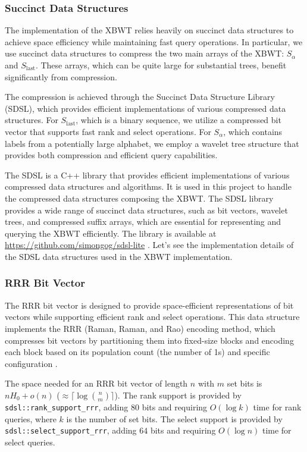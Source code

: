 \subsubsection{Succinct Data Structures}
The implementation of the XBWT relies heavily on succinct data structures to achieve space efficiency while maintaining fast query operations. In particular, we use succinct data structures to compress the two main arrays of the XBWT: $S_\alpha$ and $S_{\text{last}}$. These arrays, which can be quite large for substantial trees, benefit significantly from compression.

The compression is achieved through the Succinct Data Structure Library (SDSL), which provides efficient implementations of various compressed data structures. For $S_{\text{last}}$, which is a binary sequence, we utilize a compressed bit vector that supports fast rank and select operations. For $S_\alpha$, which contains labels from a potentially large alphabet, we employ a wavelet tree structure that provides both compression and efficient query capabilities.

The SDSL is a C++ library that provides efficient implementations of various compressed data structures and algorithms. It is used in this project to handle the compressed data structures composing the XBWT. The SDSL library provides a wide range of succinct data structures, such as bit vectors, wavelet trees, and compressed suffix arrays, which are essential for representing and querying the XBWT efficiently. The library is available at \url{https://github.com/simongog/sdsl-lite} \cite{gbmp2014sea}. Let's see the implementation details of the SDSL data structures used in the XBWT implementation.

\subsubsection{RRR Bit Vector}
The RRR bit vector is designed to provide space-efficient representations of bit vectors while supporting efficient rank and select operations. This data structure implements the RRR (Raman, Raman, and Rao) encoding method, which compresses bit vectors by partitioning them into fixed-size blocks and encoding each block based on its population count (the number of 1s) and specific configuration \cite{raman2002succinct}. 

The space needed for an RRR bit vector of length $n$ with $m$ set bits is $nH_0 + o(n)$ ($\approx \lceil \log \binom{n}{m} \rceil$). 
The rank support is provided by \texttt{sdsl::rank\_support\_rrr}, adding $80$ bits and requiring $O(\log k)$ time for rank queries, where $k$ is the number of set bits. The select support is provided by \texttt{sdsl::select\_support\_rrr}, adding $64$ bits and requiring $O(\log n)$ time for select queries.

